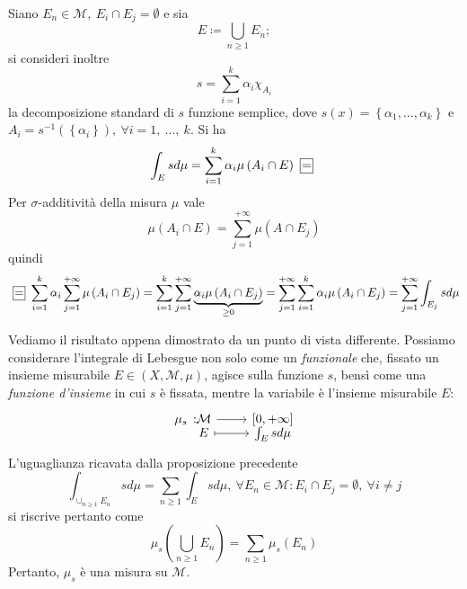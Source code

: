 \begin{demonstrationwt}
	Siano $E_n\in\mathcal{M},\ E_i\cap E_j= \emptyset$ e sia
	\begin{equation*}
		E\coloneqq\bigcup_{n\geq 1} E_n;
	\end{equation*}
	si consideri inoltre
	\begin{equation*}
		s=\sum_{i=1}^{k}\alpha_i\chi_{A_i}
	\end{equation*}
	la decomposizione standard di $s$ funzione semplice, dove $s(x)=\left\{\alpha_1,\ldots,\alpha_k\right\}$ e $A_i=s^{-1}\left(\left\{\alpha_i\right\}\right),\ \forall i=1,\ \ldots,\ k$. Si ha
	\begin{equation*}
		\int_Esd\mu=\sum_{i=1}^{k}\alpha_i\mu\left(A_i\cap E\right)\squarequal
	\end{equation*}
	Per $\sigma$-additività della misura $\mu$ vale
	\begin{equation*}
		\mu\left(A_i\cap E\right)=\sum_{j=1}^{+\infty}\mu\left(A\cap E_j\right)
	\end{equation*}
quindi
\begin{equation*}
	\squarequal \sum_{i=1}^{k}\alpha_i\sum_{j=1}^{+\infty}\mu\left(A_i\cap E_j\right)=\sum_{i=1}^{k}\sum_{j=1}^{+\infty}\underbrace{\alpha_i\mu\left(A_i\cap E_j\right)}_{\geq 0}=\sum_{j=1}^{+\infty}\sum_{i=1}^{k}\alpha_i\mu\left(A_i\cap E_j\right)=\sum_{j=1}^{+\infty}\int_{E_j}sd\mu
\end{equation*}
\end{demonstrationwt}
Vediamo il risultato appena dimostrato da un punto di vista differente. Possiamo considerare l'integrale di Lebesgue non solo come un \textit{funzionale} che, fissato un insieme misurabile $E\in\left(X,\mathcal{M},\mu\right)$, agisce sulla funzione $s$, bensì come una \textit{funzione d'insieme} in cui $s$ è fissata, mentre la variabile è l'insieme misurabile $E$:
\begin{equation}
	\funztot{\mu_s}{\mathcal{M}}{\left[0,+\infty\right]}{E}{\int_Esd\mu}
\end{equation}
L'uguaglianza ricavata dalla proposizione precedente 
\begin{equation*}
	\int_{\cup_{n\geq 1}E_n}sd\mu=\sum_{n\geq 1}\int_{E}sd\mu,\ \forall E_n\in\mathcal{M}\colon E_i\cap E_j=\emptyset,\ \forall i\neq j
\end{equation*}
si riscrive pertanto come
\begin{equation*}
	\mu_s\left(\bigcup_{n\geq 1}E_n\right)=\sum_{n\geq 1}\mu_s\left(E_n\right)
\end{equation*}
Pertanto, $\mu_s$ è una misura su $\mathcal{M}$.
